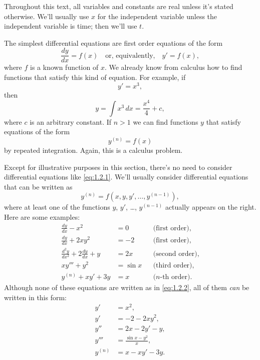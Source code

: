 Throughout this text, all variables and constants are real unless it's
stated otherwise. We'll usually use $x$ for the independent variable
unless the independent variable is time; then we'll use $t$.

The simplest differential equations are first order equations of the
form
\[
\frac{dy}{dx}=f(x) \quad\text{or, equivalently,}\quad y'=f(x),
\]
where $f$  is a known function of $x$. We already know from calculus
how to find functions that satisfy this kind of equation. For example,
if
\[
y'=x^3,
\]
then
\[
y=\int x^3\, dx=\frac{x^4}{4}+c,
\]
 where $c$ is an arbitrary constant.  If $n>1$
we can find functions $y$ that satisfy
equations of the form
\begin{equation} \label{eq:1.2.1}
y^{(n)}=f(x)
\end{equation}
by repeated integration. Again, this is a calculus problem.

Except for illustrative purposes in this section, there's no need to
consider differential equations like \eqref{eq:1.2.1}. We'll
usually consider differential equations that can be written as
\begin{equation} \label{eq:1.2.2}
y^{(n)}=f(x,y,y',\dots,y^{(n-1)}),
\end{equation}
where at least one of the functions $y$, $y'$, \dots, $y^{(n-1)}$ actually
appears on the right. Here are some examples:
\begin{align*}
\frac{dy}{dx}-x^2&=0&&\text{(first order)},  \\
\frac{dy}{dx}+2xy^2&=-2&&\text{(first order)},   \\
\frac{d^2y}{dx^2}+2\frac{dy}{dx}+y&=2x&&\text{(second order)},\\
xy'''+y^2&=\sin x  &&\text{(third order)},\\
y^{(n)}+xy'+3y&=x&&\text{($n$-th order)}.
\end{align*}
Although none of these equations are written as in
\eqref{eq:1.2.2}, all of them \emph{\color{blue}can} be written in this form:
\begin{align*}
y'&=x^2,  \\
y'&=-2-2xy^2,   \\
y''&=2x-2y'-y,  \\
y'''&=\frac{\sin x-y^2}{x},\\
y^{(n)}&=x-xy'-3y.
\end{align*}



